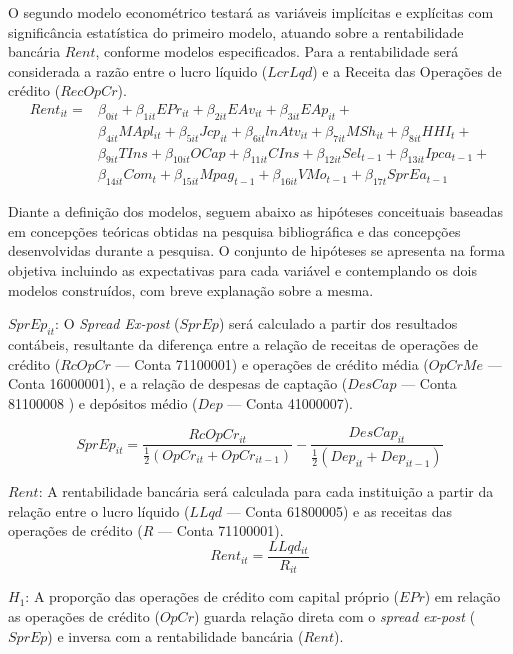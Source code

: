 \documentclass[12pt,12pt,openright,oneside,a4paper,chapter=TITLE,section=TITLE,subsection=TITLE,subsubsection=TITLE,english,french,spanish,portugues,sumario=tradicional]{abntex2}
\begin{document}
O segundo modelo econométrico testará as variáveis implícitas e explícitas com significância estatística do primeiro modelo, atuando sobre a rentabilidade bancária \(Rent\), conforme modelos especificados. Para a rentabilidade será considerada a razão entre o lucro líquido (\(LcrLqd\)) e a Receita das Operações de crédito (\(RecOpCr\)).
\[\begin{aligned}
Rent_{it} = & \beta_{0it} + \beta_{1it}EPr_{it} + \beta_{2it}EAv_{it} + \beta_{3it}EAp_{it} + \\
&\beta_{4it}MApl_{it} + \beta_{5it}Jcp_{it}  + \beta_{6it}lnAtv_{it} + \beta_{7it}MSh_{it}  + \beta_{8it}HHI_{t} + \\
& \beta_{9it}TIns + \beta_{10it}OCap + \beta_{11it}CIns + \beta_{12it}Sel_{t-1} + \beta_{13it}Ipca_{t-1} + \\
& \beta_{14it}Com_{t} + \beta_{15it}Mpag_{t-1} + \beta_{16it}VMo_{t-1} +  \beta_{17t}SprEa_{t-1}
\end{aligned}\]

Diante a definição dos modelos, seguem abaixo as hipóteses conceituais baseadas em concepções teóricas obtidas na pesquisa bibliográfica e das concepções desenvolvidas durante a pesquisa. O conjunto de hipóteses se apresenta na forma objetiva incluindo as expectativas para cada variável e contemplando os dois modelos construídos, com breve explanação sobre a mesma.

\(SprEp_{it}\): O \emph{Spread Ex-post} (\(SprEp\)) será calculado a partir dos resultados contábeis, resultante da diferença entre a relação de receitas de operações de crédito (\(RcOpCr\) --- Conta 71100001) e operações de crédito média (\(OpCrMe\) --- Conta 16000001), e a relação de despesas de captação (\(DesCap\) --- Conta 81100008 ) e depósitos médio (\(Dep\) --- Conta 41000007).

\[
SprEp_{it} = \frac{RcOpCr_{it}}{\frac{1}{2}(OpCr_{it} + OpCr_{it-1}) } - \frac{DesCap_{it}}{\frac{1}{2}(Dep_{it} + Dep_{it-1})}
\]

\(Rent\): A rentabilidade bancária será calculada para cada instituição a partir da relação entre o lucro líquido (\(LLqd\) --- Conta 61800005) e as receitas das operações de crédito (\(R\) --- Conta 71100001).
\[
Rent_{it} = \frac{LLqd_{it}}{R_{it}}
\]

\(H_{1}\): A proporção das operações de crédito com capital próprio (\(EPr\)) em relação as operações de crédito (\(OpCr\)) guarda relação direta com o \emph{spread ex-post} (\(SprEp\)) e inversa com a rentabilidade bancária (\(Rent\)).
\end{document}
